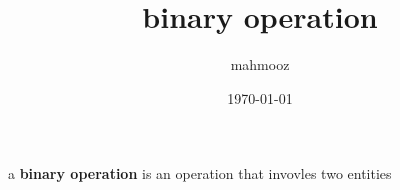 \documentclass[11pt]{article}
\author{mahmooz}
\date{\today}
\title{binary operation}
\begin{document}
\maketitle
\tableofcontents

\begin{definition}
a \textbf{binary operation} is an operation that invovles two entities\\[0pt]
\end{definition}
\end{document}
